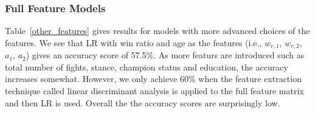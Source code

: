 \clearpage
\subsubsection*{Full Feature Models}

Table~\ref{other_features} gives results for models with more
advanced choices of the features. We see that LR with win ratio
and age as the features (i.e., $w_{r,1}$, $w_{r,2}$, $a_1$, $a_2$) gives an
accuracy score of 57.5\%. As more featurs are introduced such as
total number of fights, stance, champion status and education, the
accuracy increases somewhat. However, we only achieve 60\% when the feature
extraction technique called linear discriminant analysis is applied
to the full feature matrix and then LR is used. Overall the the accuracy
scores are surprisingly low.

